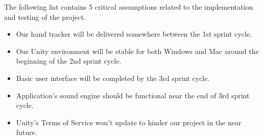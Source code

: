 The following list contains 5 critical assumptions related to the implementation and testing of the project.

\begin{itemize}
  \item Our hand tracker will be delivered somewhere between the 1st sprint cycle.
  \item Our Unity environment will be stable for both Windows and Mac around the beginning of the 2nd sprint cycle.
  \item Basic user interface will be completed by the 3rd sprint cycle.
  \item Application's sound engine should be functional near the end of 3rd sprint cycle.
  \item Unity's Terms of Service won't update to hinder our project in the near future.
\end{itemize}